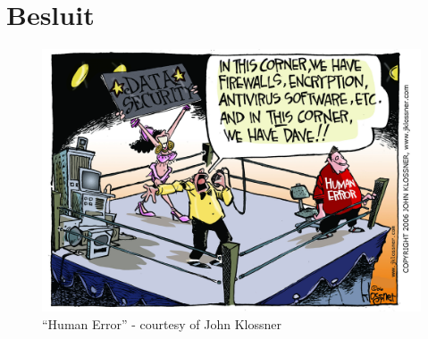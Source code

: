 \chapter{Besluit}
\label{besluit}


\TODO

\begin{figure}[ht]
  \centering
  \includegraphics[width=\linewidth]{resources/cartoon_human_error.jpg}
  \caption[``Human Error'']{``Human Error'' - courtesy of John Klossner}
\end{figure}
